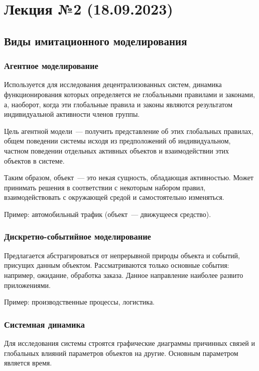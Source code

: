 \section{Лекция №2 (18.09.2023)}

\subsection{Виды имитационного моделирования}

\subsubsection{Агентное моделирование}

Используется для исследования децентрализованных систем, динамика функционирования которых определяется не глобальными правилами и законами, а, наоборот, когда эти глобальные правила и законы являются результатом индивидуальной активности членов группы.

Цель агентной модели~--- получить представление об этих глобальных правилах, общем поведении системы исходя из предположений об индивидуальном, частном поведении отдельных активных объектов и взаимодействии этих объектов в системе.

Таким образом, объект~--- это некая сущность, обладающая активностью. Может принимать решения в соответствии с некоторым набором правил, взаимодействовать с окружающей средой и самостоятельно изменяться.

Пример: автомобильный трафик (объект~--- движущееся средство).

\subsubsection{Дискретно-событийное моделирование}

Предлагается абстрагироваться от непрерывной природы объекта и событий, присущих данным объектом. Рассматриваются только основные события: например, ожидание, обработка заказа. Данное направление наиболее развито приложениями.

Пример: производственные процессы, логистика.

\subsubsection{Системная динамика}

Для исследования системы строятся графические диаграммы причинных связей и глобальных влияний параметров объектов на другие. Основным параметром является время.

